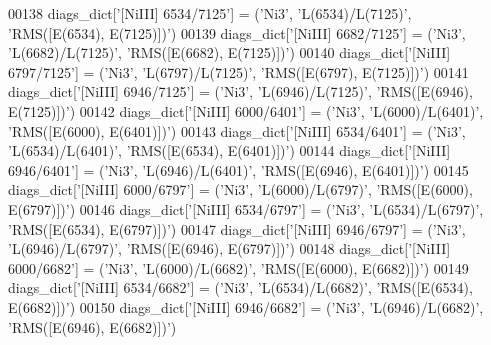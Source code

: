 \begin{DoxyCode}
00138 diags\_dict[\textcolor{stringliteral}{'[NiIII] 6534/7125'}] = (\textcolor{stringliteral}{'Ni3'}, \textcolor{stringliteral}{'L(6534)/L(7125)'}, \textcolor{stringliteral}{'RMS([E(6534), E(7125)])'})
00139 diags\_dict[\textcolor{stringliteral}{'[NiIII] 6682/7125'}] = (\textcolor{stringliteral}{'Ni3'}, \textcolor{stringliteral}{'L(6682)/L(7125)'}, \textcolor{stringliteral}{'RMS([E(6682), E(7125)])'})
00140 diags\_dict[\textcolor{stringliteral}{'[NiIII] 6797/7125'}] = (\textcolor{stringliteral}{'Ni3'}, \textcolor{stringliteral}{'L(6797)/L(7125)'}, \textcolor{stringliteral}{'RMS([E(6797), E(7125)])'})
00141 diags\_dict[\textcolor{stringliteral}{'[NiIII] 6946/7125'}] = (\textcolor{stringliteral}{'Ni3'}, \textcolor{stringliteral}{'L(6946)/L(7125)'}, \textcolor{stringliteral}{'RMS([E(6946), E(7125)])'})
00142 diags\_dict[\textcolor{stringliteral}{'[NiIII] 6000/6401'}] = (\textcolor{stringliteral}{'Ni3'}, \textcolor{stringliteral}{'L(6000)/L(6401)'}, \textcolor{stringliteral}{'RMS([E(6000), E(6401)])'})
00143 diags\_dict[\textcolor{stringliteral}{'[NiIII] 6534/6401'}] = (\textcolor{stringliteral}{'Ni3'}, \textcolor{stringliteral}{'L(6534)/L(6401)'}, \textcolor{stringliteral}{'RMS([E(6534), E(6401)])'})
00144 diags\_dict[\textcolor{stringliteral}{'[NiIII] 6946/6401'}] = (\textcolor{stringliteral}{'Ni3'}, \textcolor{stringliteral}{'L(6946)/L(6401)'}, \textcolor{stringliteral}{'RMS([E(6946), E(6401)])'})
00145 diags\_dict[\textcolor{stringliteral}{'[NiIII] 6000/6797'}] = (\textcolor{stringliteral}{'Ni3'}, \textcolor{stringliteral}{'L(6000)/L(6797)'}, \textcolor{stringliteral}{'RMS([E(6000), E(6797)])'})
00146 diags\_dict[\textcolor{stringliteral}{'[NiIII] 6534/6797'}] = (\textcolor{stringliteral}{'Ni3'}, \textcolor{stringliteral}{'L(6534)/L(6797)'}, \textcolor{stringliteral}{'RMS([E(6534), E(6797)])'})
00147 diags\_dict[\textcolor{stringliteral}{'[NiIII] 6946/6797'}] = (\textcolor{stringliteral}{'Ni3'}, \textcolor{stringliteral}{'L(6946)/L(6797)'}, \textcolor{stringliteral}{'RMS([E(6946), E(6797)])'})
00148 diags\_dict[\textcolor{stringliteral}{'[NiIII] 6000/6682'}] = (\textcolor{stringliteral}{'Ni3'}, \textcolor{stringliteral}{'L(6000)/L(6682)'}, \textcolor{stringliteral}{'RMS([E(6000), E(6682)])'})
00149 diags\_dict[\textcolor{stringliteral}{'[NiIII] 6534/6682'}] = (\textcolor{stringliteral}{'Ni3'}, \textcolor{stringliteral}{'L(6534)/L(6682)'}, \textcolor{stringliteral}{'RMS([E(6534), E(6682)])'})
00150 diags\_dict[\textcolor{stringliteral}{'[NiIII] 6946/6682'}] = (\textcolor{stringliteral}{'Ni3'}, \textcolor{stringliteral}{'L(6946)/L(6682)'}, \textcolor{stringliteral}{'RMS([E(6946), E(6682)])'})

\end{DoxyCode}
